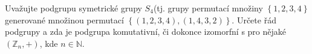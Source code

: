 Uvažujte podgrupu symetrické grupy $S_{4}$(tj. grupy permutací množiny $\left \{
  1,2,3,4 \right \}$
generované množinou permutací $\left \{ \left ( 1,2,3,4 \right ), \left (
1,4,3,2 \right ) \right \}$. Určete řád podgrupy a zda
je podgrupa komutativní, či dokonce izomorfní s pro nějaké $(\mathbb{Z}_{n}, +)$, kde
$n \in \mathbb{N}$.
